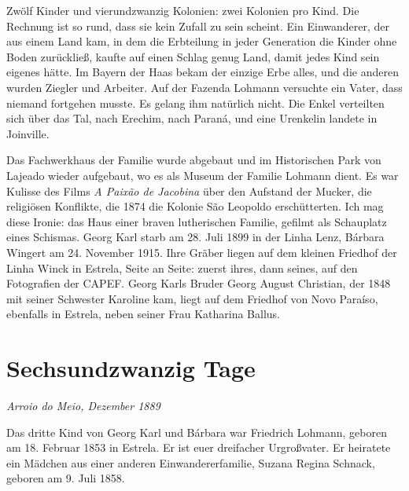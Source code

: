 \documentclass[
  ngerman,
  11pt,
  openany]{book}
\begin{document}
Zwölf Kinder und vierundzwanzig Kolonien: zwei Kolonien pro Kind. Die
Rechnung ist so rund, dass sie kein Zufall zu sein scheint. Ein
Einwanderer, der aus einem Land kam, in dem die Erbteilung in jeder
Generation die Kinder ohne Boden zurückließ, kaufte auf einen Schlag
genug Land, damit jedes Kind sein eigenes hätte. Im Bayern der Haas
bekam der einzige Erbe alles, und die anderen wurden Ziegler und
Arbeiter. Auf der Fazenda Lohmann versuchte ein Vater, dass niemand
fortgehen musste. Es gelang ihm natürlich nicht. Die Enkel verteilten
sich über das Tal, nach Erechim, nach Paraná, und eine Urenkelin landete
in Joinville.

Das Fachwerkhaus der Familie wurde abgebaut und im Historischen Park von
Lajeado wieder aufgebaut, wo es als Museum der Familie Lohmann dient. Es
war Kulisse des Films \emph{A Paixão de Jacobina} über den Aufstand der
Mucker, die religiösen Konflikte, die 1874 die Kolonie São Leopoldo
erschütterten. Ich mag diese Ironie: das Haus einer braven lutherischen
Familie, gefilmt als Schauplatz eines Schismas. Georg Karl starb am 28.
Juli 1899 in der Linha Lenz, Bárbara Wingert am 24. November 1915. Ihre
Gräber liegen auf dem kleinen Friedhof der Linha Winck in Estrela, Seite
an Seite: zuerst ihres, dann seines, auf den Fotografien der CAPEF.
Georg Karls Bruder Georg August Christian, der 1848 mit seiner Schwester
Karoline kam, liegt auf dem Friedhof von Novo Paraíso, ebenfalls in
Estrela, neben seiner Frau Katharina Ballus.

\section{Sechsundzwanzig Tage}\label{sechsundzwanzig-tage}

\emph{Arroio do Meio, Dezember 1889}

Das dritte Kind von Georg Karl und Bárbara war Friedrich Lohmann,
geboren am 18. Februar 1853 in Estrela. Er ist euer dreifacher
Urgroßvater. Er heiratete ein Mädchen aus einer anderen
Einwandererfamilie, Suzana Regina Schnack, geboren am 9. Juli 1858.
\end{document}
